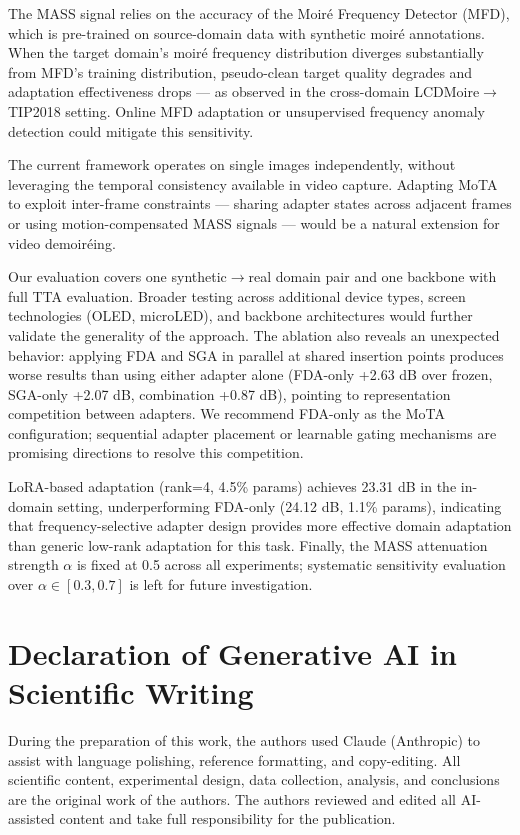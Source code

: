 \documentclass[10pt,twocolumn,letterpaper]{article}
\begin{document}
The MASS signal relies on the accuracy of the Moir\'{e} Frequency Detector (MFD), which is pre-trained on source-domain data with synthetic moir\'{e} annotations. When the target domain's moir\'{e} frequency distribution diverges substantially from MFD's training distribution, pseudo-clean target quality degrades and adaptation effectiveness drops --- as observed in the cross-domain LCDMoire$\to$TIP2018 setting. Online MFD adaptation or unsupervised frequency anomaly detection could mitigate this sensitivity.

The current framework operates on single images independently, without leveraging the temporal consistency available in video capture. Adapting MoTA to exploit inter-frame constraints --- sharing adapter states across adjacent frames or using motion-compensated MASS signals --- would be a natural extension for video demoir\'{e}ing.

Our evaluation covers one synthetic$\to$real domain pair and one backbone with full TTA evaluation. Broader testing across additional device types, screen technologies (OLED, microLED), and backbone architectures would further validate the generality of the approach. The ablation also reveals an unexpected behavior: applying FDA and SGA in parallel at shared insertion points produces worse results than using either adapter alone (FDA-only +2.63 dB over frozen, SGA-only +2.07 dB, combination +0.87 dB), pointing to representation competition between adapters. We recommend FDA-only as the MoTA configuration; sequential adapter placement or learnable gating mechanisms are promising directions to resolve this competition.

LoRA-based adaptation (rank=4, 4.5\% params) achieves 23.31 dB in the in-domain setting, underperforming FDA-only (24.12 dB, 1.1\% params), indicating that frequency-selective adapter design provides more effective domain adaptation than generic low-rank adaptation for this task. Finally, the MASS attenuation strength $\alpha$ is fixed at 0.5 across all experiments; systematic sensitivity evaluation over $\alpha \in [0.3, 0.7]$ is left for future investigation.

\section*{Declaration of Generative AI in Scientific Writing}

During the preparation of this work, the authors used Claude (Anthropic) to assist with language polishing, reference formatting, and copy-editing. All scientific content, experimental design, data collection, analysis, and conclusions are the original work of the authors. The authors reviewed and edited all AI-assisted content and take full responsibility for the publication.

{\footnotesize


}
\end{document}
